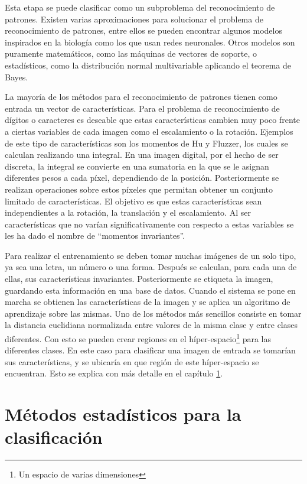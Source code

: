 \documentclass[a4paper, 11pt, oneside]{report}
\begin{document}
Esta etapa se puede clasificar como un subproblema del reconocimiento de patrones. Existen varias aproximaciones para solucionar el problema de reconocimiento de patrones, entre ellos se pueden encontrar algunos modelos inspirados en la biología como los que usan redes neuronales. Otros modelos son puramente matemáticos, como las máquinas de vectores de soporte, o estadísticos, como la distribución normal multivariable aplicando el teorema de Bayes.

La  mayoría de los métodos para el reconocimiento de patrones tienen como entrada un vector de características. Para el problema de reconocimiento de dígitos o caracteres es deseable que estas características cambien muy poco frente a ciertas variables de cada imagen como el escalamiento o la rotación. Ejemplos de este tipo de características son los momentos de Hu y Fluzzer, los cuales se calculan realizando una integral. En una imagen digital, por el hecho de ser discreta, la integral se convierte en una sumatoria en la que se le asignan diferentes pesos a cada píxel, dependiendo de la posición. Posteriormente se realizan operaciones sobre estos píxeles que permitan obtener un conjunto limitado de características. El objetivo es que estas características sean independientes a la rotación, la translación y el escalamiento. Al ser características que no varían significativamente con respecto a estas variables se les ha dado el nombre de ``momentos invariantes''.

Para realizar el entrenamiento se deben tomar muchas imágenes de un solo tipo, ya sea una letra, un número o una forma. Después se calculan, para cada una de ellas, sus características invariantes. Posteriormente se etiqueta la imagen, guardando esta información en una base de datos. Cuando el sistema se pone en marcha se obtienen las características de la imagen y se aplica un algoritmo de aprendizaje sobre las mismas. Uno de los métodos más sencillos consiste en tomar la distancia euclidiana normalizada entre valores de la misma clase y entre clases diferentes. Con esto se pueden crear regiones en el híper-espacio\footnote{Un espacio de varias dimensiones} para las diferentes clases. En este caso para clasificar una imagen de entrada se tomarían sus características, y se ubicaría en que región de este híper-espacio se encuentran. Esto se explica con más detalle en el capítulo \ref{chap:ml}.
    
\chapter{Métodos estadísticos para la clasificación}
\label{chap:ml}
\end{document}
